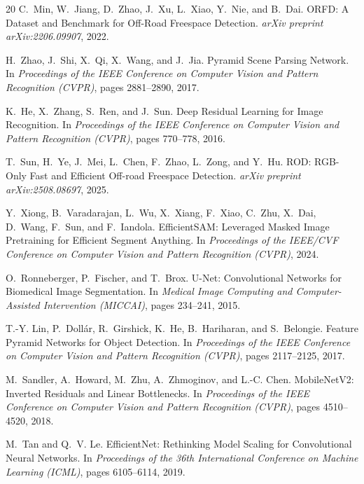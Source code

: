 \documentclass[12pt,a4paper]{report}
\begin{document}
\begin{thebibliography}{20}
C.~Min, W.~Jiang, D.~Zhao, J.~Xu, L.~Xiao, Y.~Nie, and B.~Dai.
\newblock ORFD: A Dataset and Benchmark for Off-Road Freespace Detection.
\newblock \emph{arXiv preprint arXiv:2206.09907}, 2022.

H.~Zhao, J.~Shi, X.~Qi, X.~Wang, and J.~Jia.
\newblock Pyramid Scene Parsing Network.
\newblock In \emph{Proceedings of the IEEE Conference on Computer Vision and Pattern Recognition (CVPR)}, pages 2881--2890, 2017.

K.~He, X.~Zhang, S.~Ren, and J.~Sun.
\newblock Deep Residual Learning for Image Recognition.
\newblock In \emph{Proceedings of the IEEE Conference on Computer Vision and Pattern Recognition (CVPR)}, pages 770--778, 2016.

T.~Sun, H.~Ye, J.~Mei, L.~Chen, F.~Zhao, L.~Zong, and Y.~Hu.
\newblock ROD: RGB-Only Fast and Efficient Off-road Freespace Detection.
\newblock \emph{arXiv preprint arXiv:2508.08697}, 2025.

Y.~Xiong, B.~Varadarajan, L.~Wu, X.~Xiang, F.~Xiao, C.~Zhu, X.~Dai,
D.~Wang, F.~Sun, and F.~Iandola.
\newblock EfficientSAM: Leveraged Masked Image Pretraining for Efficient
Segment Anything.
\newblock In \emph{Proceedings of the IEEE/CVF Conference on Computer Vision
and Pattern Recognition (CVPR)}, 2024.

O.~Ronneberger, P.~Fischer, and T.~Brox.
\newblock U-Net: Convolutional Networks for Biomedical Image Segmentation.
\newblock In \emph{Medical Image Computing and Computer-Assisted Intervention
(MICCAI)}, pages 234--241, 2015.

T.-Y. Lin, P.~Doll\'{a}r, R.~Girshick, K.~He, B.~Hariharan, and S.~Belongie.
\newblock Feature Pyramid Networks for Object Detection.
\newblock In \emph{Proceedings of the IEEE Conference on Computer Vision and
Pattern Recognition (CVPR)}, pages 2117--2125, 2017.

M.~Sandler, A.~Howard, M.~Zhu, A.~Zhmoginov, and L.-C. Chen.
\newblock MobileNetV2: Inverted Residuals and Linear Bottlenecks.
\newblock In \emph{Proceedings of the IEEE Conference on Computer Vision and
Pattern Recognition (CVPR)}, pages 4510--4520, 2018.

M.~Tan and Q.~V. Le.
\newblock EfficientNet: Rethinking Model Scaling for Convolutional Neural Networks.
\newblock In \emph{Proceedings of the 36th International Conference on Machine
Learning (ICML)}, pages 6105--6114, 2019.


\end{thebibliography}
\end{document}
